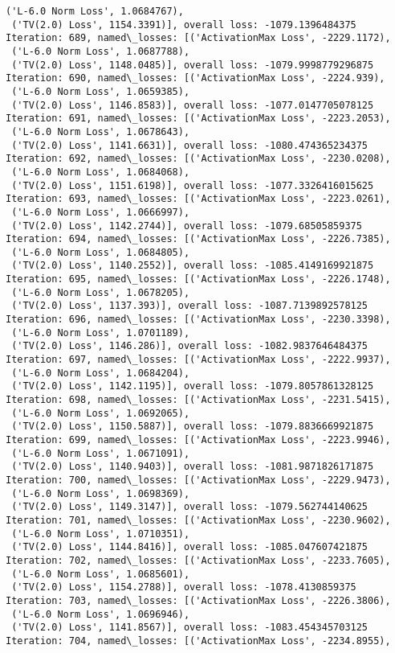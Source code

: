 \documentclass[10pt]{article}
\begin{document}
\begin{Verbatim}[commandchars=\\\{\}]
 ('L-6.0 Norm Loss', 1.0684767),
 ('TV(2.0) Loss', 1154.3391)], overall loss: -1079.1396484375
Iteration: 689, named\_losses: [('ActivationMax Loss', -2229.1172),
 ('L-6.0 Norm Loss', 1.0687788),
 ('TV(2.0) Loss', 1148.0485)], overall loss: -1079.9998779296875
Iteration: 690, named\_losses: [('ActivationMax Loss', -2224.939),
 ('L-6.0 Norm Loss', 1.0659385),
 ('TV(2.0) Loss', 1146.8583)], overall loss: -1077.0147705078125
Iteration: 691, named\_losses: [('ActivationMax Loss', -2223.2053),
 ('L-6.0 Norm Loss', 1.0678643),
 ('TV(2.0) Loss', 1141.6631)], overall loss: -1080.474365234375
Iteration: 692, named\_losses: [('ActivationMax Loss', -2230.0208),
 ('L-6.0 Norm Loss', 1.0684068),
 ('TV(2.0) Loss', 1151.6198)], overall loss: -1077.3326416015625
Iteration: 693, named\_losses: [('ActivationMax Loss', -2223.0261),
 ('L-6.0 Norm Loss', 1.0666997),
 ('TV(2.0) Loss', 1142.2744)], overall loss: -1079.68505859375
Iteration: 694, named\_losses: [('ActivationMax Loss', -2226.7385),
 ('L-6.0 Norm Loss', 1.0684805),
 ('TV(2.0) Loss', 1140.2552)], overall loss: -1085.4149169921875
Iteration: 695, named\_losses: [('ActivationMax Loss', -2226.1748),
 ('L-6.0 Norm Loss', 1.0678205),
 ('TV(2.0) Loss', 1137.393)], overall loss: -1087.7139892578125
Iteration: 696, named\_losses: [('ActivationMax Loss', -2230.3398),
 ('L-6.0 Norm Loss', 1.0701189),
 ('TV(2.0) Loss', 1146.286)], overall loss: -1082.9837646484375
Iteration: 697, named\_losses: [('ActivationMax Loss', -2222.9937),
 ('L-6.0 Norm Loss', 1.0684204),
 ('TV(2.0) Loss', 1142.1195)], overall loss: -1079.8057861328125
Iteration: 698, named\_losses: [('ActivationMax Loss', -2231.5415),
 ('L-6.0 Norm Loss', 1.0692065),
 ('TV(2.0) Loss', 1150.5887)], overall loss: -1079.8836669921875
Iteration: 699, named\_losses: [('ActivationMax Loss', -2223.9946),
 ('L-6.0 Norm Loss', 1.0671091),
 ('TV(2.0) Loss', 1140.9403)], overall loss: -1081.9871826171875
Iteration: 700, named\_losses: [('ActivationMax Loss', -2229.9473),
 ('L-6.0 Norm Loss', 1.0698369),
 ('TV(2.0) Loss', 1149.3147)], overall loss: -1079.562744140625
Iteration: 701, named\_losses: [('ActivationMax Loss', -2230.9602),
 ('L-6.0 Norm Loss', 1.0710351),
 ('TV(2.0) Loss', 1144.8416)], overall loss: -1085.047607421875
Iteration: 702, named\_losses: [('ActivationMax Loss', -2233.7605),
 ('L-6.0 Norm Loss', 1.0685601),
 ('TV(2.0) Loss', 1154.2788)], overall loss: -1078.4130859375
Iteration: 703, named\_losses: [('ActivationMax Loss', -2226.3806),
 ('L-6.0 Norm Loss', 1.0696946),
 ('TV(2.0) Loss', 1141.8567)], overall loss: -1083.454345703125
Iteration: 704, named\_losses: [('ActivationMax Loss', -2234.8955),

\end{Verbatim}
\end{document}
